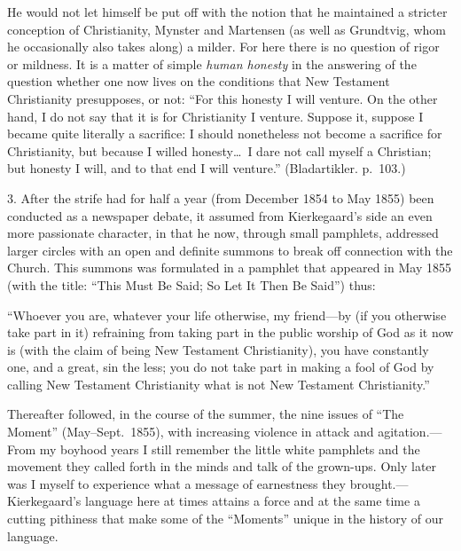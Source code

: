 \documentclass[12pt,a4paper]{book}
\newcommand{\opage}[1]{\marginnote{\footnotesize\textit{[#1]}}}
\begin{document}
He would not let himself be put off with the notion that he maintained a
stricter conception of Christianity, Mynster and Martensen (as well as
Grundtvig, whom he occasionally also takes along) a milder. For here
there is no question of rigor or mildness. It is a matter of simple
\textit{human honesty} in the answering of the question whether one now
lives on the conditions that New Testament Christianity presupposes, or
not: ``For this honesty I will venture. On the other hand, I do not say
that it is for Christianity I venture. Suppose it, suppose I became quite
literally a sacrifice: I should nonetheless not become a sacrifice for
Christianity, but because I willed honesty\dots\ I dare not call myself a
Christian; but honesty I will, and to that end I will venture.''
(Bladartikler. p.~103.)

3. After the strife had for half a year (from December 1854 to May 1855)
been conducted as a newspaper debate, it assumed from Kierkegaard's side
an even more passionate character, in that he now, through small
pamphlets, addressed larger circles with an open and definite summons to
break off connection with the Church. This summons was formulated in a
pamphlet that appeared in May 1855 (with the title: ``This Must Be Said;
So Let It Then Be Said'') thus:

``Whoever you are, whatever your life otherwise, my friend---by (if you
otherwise take part in it) refraining from
\opage{147}taking part in the public worship of God as it now is (with the
claim of being New Testament Christianity), you have constantly one, and
a great, sin the less; you do not take part in making a fool of God by
calling New Testament Christianity what is not New Testament
Christianity.''

Thereafter followed, in the course of the summer, the nine issues of
``The Moment'' (May--Sept.\ 1855), with increasing violence in attack and
agitation.---From my boyhood years I still remember the little white
pamphlets and the movement they called forth in the minds and talk of
the grown-ups. Only later was I myself to experience what a message of
earnestness they brought.---Kierkegaard's language here at times attains
a force and at the same time a cutting pithiness that make some of the
``Moments'' unique in the history of our language.
\end{document}
